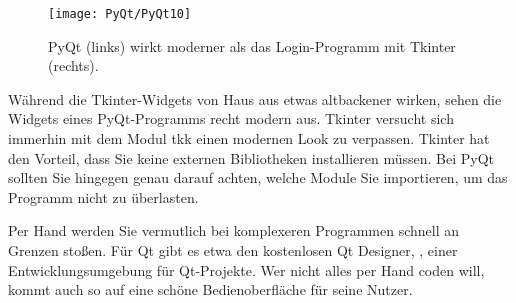 \begin{figure}
  \texttt{[image: PyQt/PyQt10]}    
  \caption{PyQt (links) wirkt moderner als das Login-Programm mit Tkinter (rechts).}\label{PyQt10}
\end{figure}    

Während die Tkinter-Widgets von Haus aus etwas altbackener wirken, sehen die Widgets eines PyQt-Programms recht modern aus. Tkinter versucht sich immerhin mit dem Modul tkk einen modernen Look zu verpassen. Tkinter hat den Vorteil, dass Sie keine externen Bibliotheken installieren müssen. Bei PyQt sollten Sie hingegen genau darauf achten, welche Module Sie importieren, um das Programm nicht zu überlasten.
    
Per Hand werden Sie vermutlich bei komplexeren Programmen schnell an Grenzen stoßen. Für Qt gibt es etwa den kostenlosen Qt Designer, , einer Entwicklungsumgebung für Qt-Projekte. Wer nicht alles per Hand coden will, kommt auch so auf eine schöne Bedienoberfläche für seine Nutzer. 
